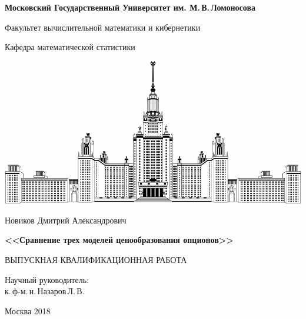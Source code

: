 \documentclass[oneside, final, 12pt]{article}
\begin{document}


\thispagestyle{empty}
\centerline{\bf Московский Государственный Университет им. М.\,В.\,Ломоносова}
\vskip0.1cm
\centerline{Факультет вычислительной математики и кибернетики}
\centerline{Кафедра математической статистики}
\vskip0.1cm
\centerline{\hfill\hrulefill\hrulefill\hfill}

\begin{center}
  \includegraphics[width=0.5\linewidth]{img/msu_logo.jpg}
\end{center}

\vfill
\vfill
\large
\centerline{Новиков Дмитрий Александрович}
\vfill
\large
\begin{centering}
\vskip0.2cm
\Large
{\bf <<Сравнение трех моделей ценообразования опционов>>\\}
\end{centering}
\normalsize
\vfill
\vfill
\vfill
\centerline{ВЫПУСКНАЯ КВАЛИФИКАЦИОННАЯ РАБОТА}
\vfill
\begin{flushright}
Научный руководитель:\\
к.\,ф-м.\,н.\,Назаров\,Л.\,В.
\end{flushright}
\vfill
\vfill
\centerline{Москва 2018}
\end{document}
